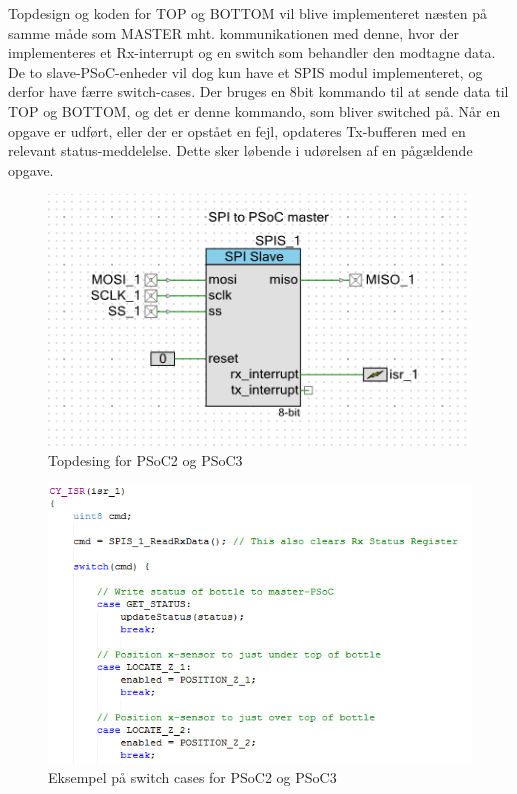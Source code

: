 Topdesign og koden for TOP og BOTTOM vil blive implementeret næsten på samme måde som MASTER mht. kommunikationen med denne, hvor der implementeres et Rx-interrupt
og en switch som behandler den modtagne data. De to slave-PSoC-enheder vil dog kun have et SPIS modul implementeret, og derfor have færre switch-cases.
Der bruges en 8bit kommando til at sende data til TOP og BOTTOM, og det er denne kommando, som bliver switched på. Når en opgave er udført, eller der er opstået
en fejl, opdateres Tx-bufferen med en relevant status-meddelelse. Dette sker løbende i udørelsen af en pågældende opgave.
\begin{figure}[H]
\includegraphics{Screenshots/PSOC_topdesign_SPIS}
\caption{Topdesing for PSoC2 og PSoC3}
\end{figure}

\begin{figure}[H]
\includegraphics[scale=0.9]{Screenshots/PSOC_switch_slave}
\caption{Eksempel på switch cases for PSoC2 og PSoC3}
\end{figure}     
 
